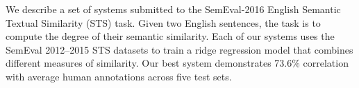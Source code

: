We describe a set of systems submitted to the SemEval-2016 English Semantic Textual Similarity (STS) task. Given two English sentences, the task is to compute the degree of their semantic similarity. Each of our systems uses the SemEval 2012--2015 STS datasets to train a ridge regression model that combines different measures of similarity. Our best system demonstrates 73.6\% correlation with average human annotations across five test sets.
